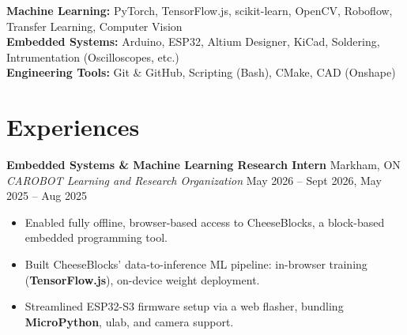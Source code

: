 \documentclass[10pt,letterpaper]{article}
\begin{document}
\hspace{0.75em}\textbf{Machine Learning:} 
PyTorch, TensorFlow.js, scikit-learn, OpenCV, Roboflow, 
Transfer Learning, Computer Vision \\

\hspace{0.75em}\textbf{Embedded Systems:} 
    Arduino, ESP32, Altium Designer, KiCad, Soldering,
    Intrumentation (Oscilloscopes, etc.) \\

\hspace{0.75em}\textbf{Engineering Tools:} 
Git \& GitHub, Scripting (Bash), CMake, CAD (Onshape) \\







\section{Experiences}


\textbf{Embedded Systems \& Machine Learning Research Intern} \hfill
Markham, ON \\
\textit{CAROBOT Learning and Research Organization} \hfill 
May 2026 -- Sept 2026, May 2025 -- Aug 2025 \\
\begin{itemize}
    \item Enabled fully offline, browser-based access to CheeseBlocks, a block-based embedded programming tool.
    \item Built CheeseBlocks' data-to-inference ML pipeline: in-browser training (\textbf{TensorFlow.js}), on-device weight deployment.
    \item Streamlined ESP32-S3 firmware setup via a web flasher, bundling \textbf{MicroPython}, ulab, and camera support.
\end{itemize}
\end{document}
